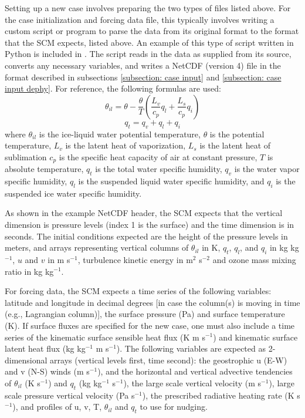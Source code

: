 Setting up a new case involves preparing the two types of files listed above. For the case initialization and forcing data file, this typically involves writing a custom script or program to parse the data from its original format to the format that the SCM expects, listed above. An example of this type of script written in Python is included in . The script reads in the data as supplied from its source, converts any necessary variables, and writes a NetCDF (version 4) file in the format described in subsections \ref{subsection: case input} and \ref{subsection: case input dephy}. For reference, the following formulas are used:
\begin{equation}
\theta_{il} = \theta - \frac{\theta}{T}\left(\frac{L_v}{c_p}q_l + \frac{L_s}{c_p}q_i\right)
\end{equation}
\begin{equation}
q_t = q_v + q_l + q_i
\end{equation}
where $\theta_{il}$ is the ice-liquid water potential temperature, $\theta$ is the potential temperature, $L_v$ is the latent heat of vaporization, $L_s$ is the latent heat of sublimation $c_p$ is the specific heat capacity of air at constant pressure, $T$ is absolute temperature, $q_t$ is the total water specific humidity, $q_v$ is the water vapor specific humidity, $q_l$ is the suspended liquid water specific humidity, and $q_i$ is the suspended ice water specific humidity.

As shown in the example NetCDF header, the SCM expects that the vertical dimension is pressure levels (index 1 is the surface) and the time dimension is in seconds. The initial conditions expected are the height of the pressure levels in meters, and arrays representing vertical columns of $\theta_{il}$ in K, $q_t$, $q_l$, and $q_i$ in kg kg$^{-1}$, $u$ and $v$ in m s$^{-1}$, turbulence kinetic energy in m$^2$ s$^{-2}$ and ozone mass mixing ratio in kg kg$^{-1}$.

For forcing data, the SCM expects a time series of the following variables: latitude and longitude in decimal degrees [in case the column(s) is moving in time (e.g., Lagrangian column)], the surface pressure (Pa) and surface temperature (K). If surface fluxes are specified for the new case, one must also include a time series of the kinematic surface sensible heat flux (K m s$^{-1}$) and kinematic surface latent heat flux (kg kg$^{-1}$ m s$^{-1}$). The following variables are expected as 2-dimensional arrays (vertical levels first, time second):  the geostrophic u (E-W) and v (N-S) winds (m s$^{-1}$), and the horizontal and vertical advective tendencies of $\theta_{il}$ (K s$^{-1}$) and $q_t$ (kg kg$^{-1}$ s$^{-1}$), the large scale vertical velocity (m s$^{-1}$), large scale pressure vertical velocity (Pa s$^{-1}$), the prescribed radiative heating rate (K s$^{-1}$), and profiles of u, v, T, $\theta_{il}$ and $q_t$ to use for nudging.

